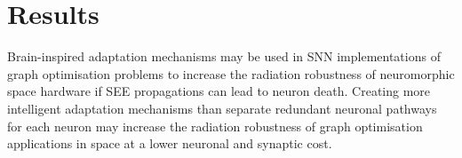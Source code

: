 \section{Results}\label{sec:conclusion}
Brain-inspired adaptation mechanisms may be used in SNN implementations of graph optimisation problems to increase the radiation robustness of neuromorphic space hardware if SEE propagations can lead to neuron death. Creating more intelligent adaptation mechanisms than separate redundant neuronal pathways for each neuron may increase the radiation robustness of graph optimisation applications  in space at a lower neuronal and synaptic cost.


